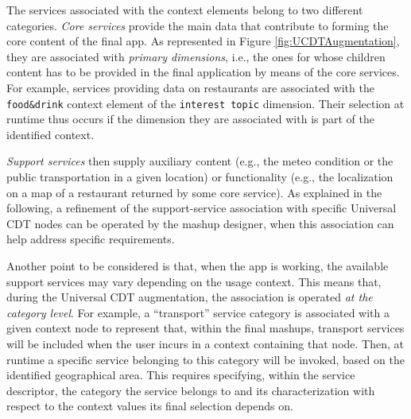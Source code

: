 The services associated with the context elements belong to two different categories. \emph{Core services} provide the main data that contribute to forming the core content of the final app. As represented in Figure \ref{fig:UCDTAugmentation}, they are associated with \emph{primary dimensions}, i.e., the ones for whose children content has to be provided in the final application by means of the core services. For example, services providing data on restaurants are associated with the \texttt{food\&drink} context element of the \texttt{interest topic} dimension. Their selection at runtime thus occurs if the dimension they are associated with is part of the identified context. 

\emph{Support services} then supply auxiliary content (e.g., the meteo condition or the public transportation in a given location) or functionality (e.g., the localization on a map of a restaurant returned by some core service).
%
As explained in the following, a refinement of the support-service association with specific Universal CDT nodes can be operated by the mashup designer, when this association can help address specific requirements. 

Another point to be considered is that, when the app is working, the available support services may vary depending on the usage context. This means that, during the Universal CDT augmentation, the association  is operated \emph{at the category level}. For example, a ``transport'' service category is associated with a given context node to represent that,  within the final mashups,  transport services will be included when the user incurs in a context containing that node. Then, at runtime a specific service belonging to this category will be invoked, based on the identified geographical area. This requires specifying, within the service descriptor, the category the service belongs to and its characterization with respect to the context values its final selection depends on.


